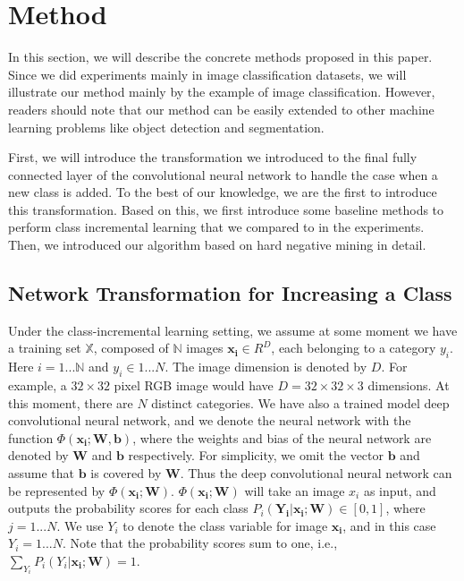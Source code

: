 \chapter{Method}
In this section, we will describe the concrete methods proposed in this paper. Since we did experiments mainly in image classification datasets, we will illustrate our method mainly by the example of image classification. However, readers should note that our method can be easily extended to other machine learning problems like object detection and segmentation.

First, we will introduce the transformation we introduced to the final fully connected layer of the convolutional neural network to handle the case when a new class is added. To the best of our knowledge, we are the first to introduce this transformation. Based on this, we first introduce some baseline methods to perform class incremental learning that we compared to in the experiments. Then, we introduced our algorithm based on hard negative mining in detail.

\section{Network Transformation for Increasing a Class}

Under the class-incremental learning setting, we assume at some moment we have a training set $\mathbb{X}$, composed of $\mathbb{N}$ images $\mathbf{x_i} \in R^D$, each belonging to a category $y_i$. Here $i = 1 ...\mathbb{N}$ and $y_i \in 1 ... N$. The image dimension is denoted by $D$. For example, a $32\times32$ pixel RGB image would have $D=32\times32\times3$ dimensions. At this moment, there are $N$ distinct categories. We have also a trained model deep convolutional neural network, and we denote the neural network with the function $\Phi(\mathbf{x_i}; \mathbf{W}, \mathbf{b})$, where the weights and bias of the neural network are denoted by $\mathbf{W}$ and $\mathbf{b}$ respectively. For simplicity, we omit the vector $\mathbf{b}$ and assume that $\mathbf{b}$ is covered by $\mathbf{W}$. Thus the deep convolutional neural network can be represented by $\Phi(\mathbf{x_i}; \mathbf{W})$. $\Phi(\mathbf{x_i}; \mathbf{W})$ will take an image $x_i$ as input, and outputs the probability scores for each class $P_i(\mathbf{Y_i}|\mathbf{x_i};\mathbf{W})\in [0,1]$, where $j = 1 ... N$. We use $Y_i$ to denote the class variable for image $\mathbf{x_i}$, and in this case $Y_i =1...N$.  Note that the probability scores sum to one, i.e., $\sum_{Y_i} P_i(Y_i|\mathbf{x_i};\mathbf{W}) = 1$.

